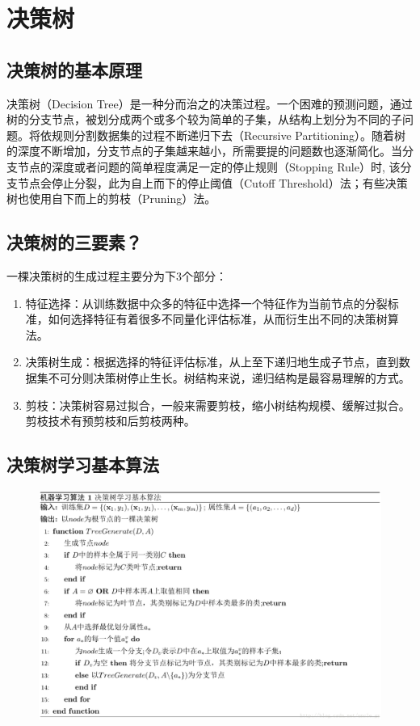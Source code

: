 \section{决策树}

\subsection{决策树的基本原理}

决策树（Decision Tree）是一种分而治之的决策过程。一个困难的预测问题，通过树的分支节点，被划分成两个或多个较为简单的子集，从结构上划分为不同的子问题。将依规则分割数据集的过程不断递归下去（Recursive Partitioning）。随着树的深度不断增加，分支节点的子集越来越小，所需要提的问题数也逐渐简化。当分支节点的深度或者问题的简单程度满足一定的停止规则（Stopping Rule）时, 该分支节点会停止分裂，此为自上而下的停止阈值（Cutoff Threshold）法；有些决策树也使用自下而上的剪枝（Pruning）法。

\subsection{决策树的三要素？}

一棵决策树的生成过程主要分为下3个部分：

\begin{enumerate}\itemsep0em
		\item 特征选择：从训练数据中众多的特征中选择一个特征作为当前节点的分裂标准，如何选择特征有着很多不同量化评估标准，从而衍生出不同的决策树算法。
		\item 决策树生成：根据选择的特征评估标准，从上至下递归地生成子节点，直到数据集不可分则决策树停止生长。树结构来说，递归结构是最容易理解的方式。
		\item 剪枝：决策树容易过拟合，一般来需要剪枝，缩小树结构规模、缓解过拟合。剪枝技术有预剪枝和后剪枝两种。
\end{enumerate}

\subsection{决策树学习基本算法}

 \begin{figure}[h]
   \centering
   \includegraphics[width=.9\textwidth]{imgs/2-5.eps}
 \end{figure}

